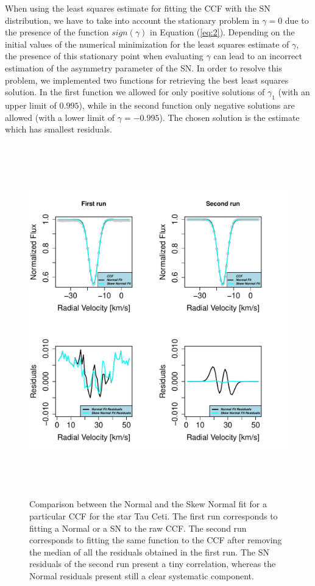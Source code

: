 \documentclass[11pt, oneside]{article}
\begin{document}
When using the least squares estimate for fitting the CCF with the SN distribution, we have to take into account the stationary problem in $\gamma=0$ due to the presence of the function $sign(\gamma)$ in Equation (\ref{eq:2}). Depending on the initial values of the numerical minimization for the least squares estimate of $\gamma$, the presence of this stationary point when evaluating $\gamma$ can lead to an incorrect estimation of the asymmetry parameter of the SN. In order to resolve this problem, we implemented two functions for retrieving the best least squares solution. In the first function we allowed for only positive solutions of $\gamma_1$ (with an upper limit of $0.995$), while in the second function only negative solutions are allowed (with a lower limit of $\gamma= -0.995$). The chosen solution is the estimate which has smallest residuals.



\begin{figure}[htbp]
   \centering
\includegraphics[height = 6in]{[1]Plot_Fitting_and_Residuals_2run.pdf} 
   \caption{Comparison between the Normal and the Skew Normal fit for a particular CCF for the star Tau Ceti. The first run corresponds to fitting a Normal or a SN to the raw CCF. The second run corresponds to fitting the same function to the CCF after removing the median of all the residuals obtained in the first run. The SN residuals of the second run present a tiny correlation, whereas the Normal residuals present still a clear systematic component.}
   \label{fig:Residual.comparison}
\end{figure}
\end{document}
